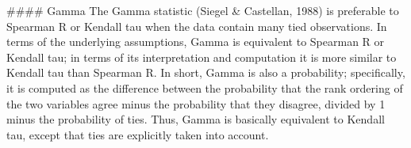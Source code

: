 
#### {Gamma} 
The Gamma statistic (Siegel & Castellan, 1988) is preferable to Spearman R or Kendall tau when the data contain many tied observations. In terms of the underlying assumptions, Gamma is equivalent to Spearman R or Kendall tau; in terms of its interpretation and computation it is more similar to Kendall tau than Spearman R. In short, Gamma is also a probability; specifically, it is computed as the difference between the probability that the rank ordering of the two variables agree minus the probability that they disagree, divided by 1 minus the probability of ties. Thus, Gamma is basically equivalent to Kendall tau, except that ties are explicitly taken into account.
